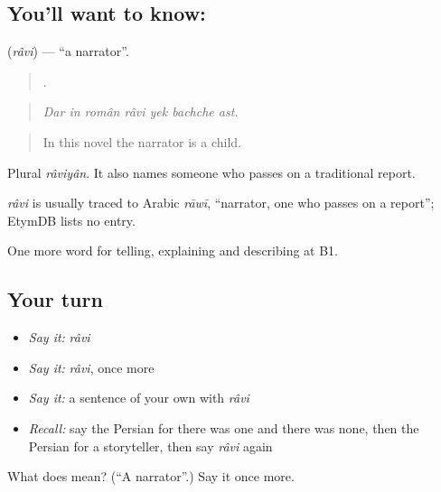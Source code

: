 \subsection*{You'll want to know: }
\textbf{} (\emph{râvi}) — \textquotedblleft{}a narrator\textquotedblright{}.

\begin{quote}
      .
\end{quote}

\begin{quote}
\emph{Dar in român râvi yek bachche ast.}
\end{quote}

\begin{quote}
In this novel the narrator is a child.
\end{quote}

Plural \emph{râviyân}. It also names someone who passes on a traditional report.

\begin{cousinweb}
\emph{râvi} is usually traced to Arabic \emph{rāwī}, \textquotedblleft{}narrator, one who passes on a report\textquotedblright{}; EtymDB lists no entry.
\end{cousinweb}

\begin{grammarlens}[title={What you've built}]
One more word for telling, explaining and describing at B1.
\end{grammarlens}

\subsection*{Your turn}
\begin{itemize}
\raggedright
  \item \emph{Say it:} \emph{râvi}
  \item \emph{Say it:} \emph{râvi}, once more
  \item \emph{Say it:} a sentence of your own with \emph{râvi}
  \item \emph{Recall:} say the Persian for there was one and there was none, then the Persian for a storyteller, then say \emph{râvi} again
\end{itemize}

\begin{tcolorbox}[breakable,colback=teal!4,colframe=teal!35!black,title={Before you move on}]
What does  mean? (\textquotedblleft{}A narrator\textquotedblright{}.) Say it once more.
\end{tcolorbox}
